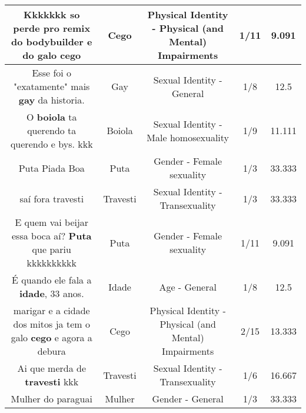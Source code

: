 \documentclass[11pt]{article}
\newlength\mylength
\begin{document}
\begin{center}
\begin{longtable}{|C{.65\mylength}|C{.30\mylength}|C{.12\mylength}|C{.12\mylength}|C{.12\mylength}|}
  \small Kkkkkkk so perde pro remix do bodybuilder e do galo cego\normalsize   & Cego & Physical Identity - Physical (and Mental) Impairments & 1/11 & 9.091 \\  \hline
  \small Esse foi o "exatamente" mais \textbf{gay} da historia.\normalsize   & Gay & Sexual Identity - General & 1/8 & 12.5 \\  \hline
  \small O \textbf{boiola} ta querendo ta querendo e bys. kkk\normalsize   & Boiola & Sexual Identity - Male homosexuality & 1/9 & 11.111 \\  \hline
  \small Puta Piada Boa\normalsize   & Puta & Gender - Female sexuality & 1/3 & 33.333 \\  \hline
  \small saí fora travesti\normalsize   & Travesti & Sexual Identity - Transexuality & 1/3 & 33.333 \\  \hline
  \small E quem vai beijar essa boca aí? \textbf{Puta} que pariu kkkkkkkkkk\normalsize   & Puta & Gender - Female sexuality & 1/11 & 9.091 \\  \hline
  \small É quando ele fala a \textbf{idade}, 33 anos.\normalsize   & Idade & Age - General & 1/8 & 12.5 \\  \hline
  \small marigar e a cidade dos mitos ja tem o galo \textbf{cego} e agora a debura\normalsize   & Cego & Physical Identity - Physical (and Mental) Impairments & 2/15 & 13.333 \\  \hline
  \small Ai que merda de \textbf{travesti} kkk\normalsize   & Travesti & Sexual Identity - Transexuality & 1/6 & 16.667 \\  \hline
  \small Mulher do paraguai\normalsize   & Mulher & Gender - General & 1/3 & 33.333 \\  \hline

\end{longtable}
\end{center}
\end{document}
